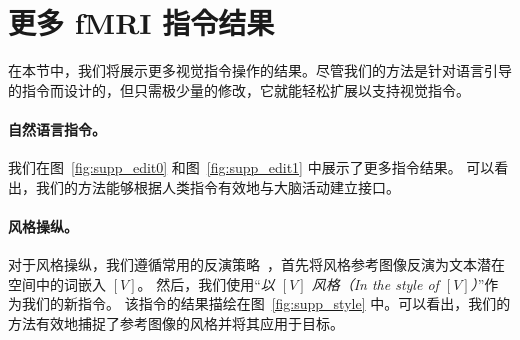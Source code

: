 \section{更多 fMRI 指令结果}
在本节中，我们将展示更多视觉指令操作的结果。尽管我们的方法是针对语言引导的指令而设计的，但只需极少量的修改，它就能轻松扩展以支持视觉指令。

\paragraph{自然语言指令。}
我们在图~\ref{fig:supp_edit0} 和图~\ref{fig:supp_edit1} 中展示了更多指令结果。
可以看出，我们的方法能够根据人类指令有效地与大脑活动建立接口。

\paragraph{风格操纵。}
对于风格操纵，我们遵循常用的反演策略~\cite{ruiz2023dreambooth,mokady2023null}，首先将风格参考图像反演为文本潜在空间中的词嵌入 ${[V]}$。
然后，我们使用“\emph{以 $[V]$ 风格（In the style of $[V]$）}”作为我们的新指令。
该指令的结果描绘在图~\ref{fig:supp_style} 中。可以看出，我们的方法有效地捕捉了参考图像的风格并将其应用于目标。


